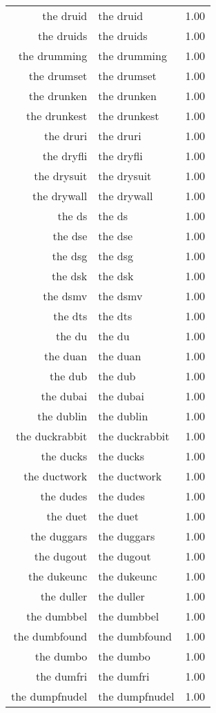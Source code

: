 \begin{table}[ht]
\begin{tabular}{rlr}
  the druid & the druid & 1.00 \\ 
  the druids & the druids & 1.00 \\ 
  the drumming & the drumming & 1.00 \\ 
  the drumset & the drumset & 1.00 \\ 
  the drunken & the drunken & 1.00 \\ 
  the drunkest & the drunkest & 1.00 \\ 
  the druri & the druri & 1.00 \\ 
  the dryfli & the dryfli & 1.00 \\ 
  the drysuit & the drysuit & 1.00 \\ 
  the drywall & the drywall & 1.00 \\ 
  the ds & the ds & 1.00 \\ 
  the dse & the dse & 1.00 \\ 
  the dsg & the dsg & 1.00 \\ 
  the dsk & the dsk & 1.00 \\ 
  the dsmv & the dsmv & 1.00 \\ 
  the dts & the dts & 1.00 \\ 
  the du & the du & 1.00 \\ 
  the duan & the duan & 1.00 \\ 
  the dub & the dub & 1.00 \\ 
  the dubai & the dubai & 1.00 \\ 
  the dublin & the dublin & 1.00 \\ 
  the duckrabbit & the duckrabbit & 1.00 \\ 
  the ducks & the ducks & 1.00 \\ 
  the ductwork & the ductwork & 1.00 \\ 
  the dudes & the dudes & 1.00 \\ 
  the duet & the duet & 1.00 \\ 
  the duggars & the duggars & 1.00 \\ 
  the dugout & the dugout & 1.00 \\ 
  the dukeunc & the dukeunc & 1.00 \\ 
  the duller & the duller & 1.00 \\ 
  the dumbbel & the dumbbel & 1.00 \\ 
  the dumbfound & the dumbfound & 1.00 \\ 
  the dumbo & the dumbo & 1.00 \\ 
  the dumfri & the dumfri & 1.00 \\ 
  the dumpfnudel & the dumpfnudel & 1.00 \\ 

\end{tabular}
\end{table}

